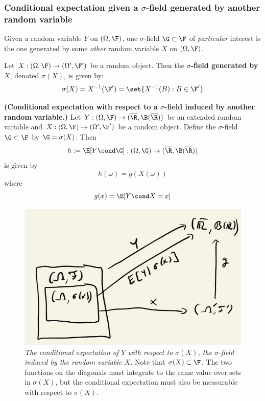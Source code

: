 \documentclass{article} %
\begin{document}
\subsubsection{Conditional expectation given a $\sigma$-field generated by another random variable}  \label{sec:conditional_expectation_wrt_a_sigma_field_induced_by_another_random_variable}

Given a random variable $Y$ on $(\Omega, \F)$, one $\sigma$-field $\G \subset \F$ of \textit{particular} interest is the one generated by some \textit{other} random variable $X$ on $(\Omega, \F)$.

\begin{definition}
Let $X: (\Omega, \F) \to (\Omega', \F')$ be a random object.  Then the \textbf{$\sigma$-field generated by $X$}, denoted $\sigma(X)$, is given by:
\[ \sigma(X) = X^{-1}(\F') = \set{X^{-1}(B) : B \in \F'} \]
\label{def:sigma_field_generated_by_a_random_object}
\end{definition}

\begin{proposition}\textbf{(Conditional expectation with respect to a $\sigma$-field induced by another random variable.)}
Let $Y: (\Omega, \F) \to (\overline{\R}, \B(\overline{\R}))$ be an extended random variable and  $X: (\Omega, \F) \to (\Omega', \F')$ be a random object.  Define the $\sigma$-field $\G \subset \F$ by $\G =\sigma(X)$.  
Then 
\[ h:= \E[Y \cond \G] : (\Omega, \G) \to (\overline{\R}, \B(\overline{\R}))\]
is given by 
\[ h(\omega) = g(X(\omega))\]
where 
\[g(x) = \E[Y \cond X=x]\]
\label{prop:conditional_expectation_wrt_sigma_field_induced_by_another_random_variable}
\end{proposition}

\begin{figure}[H]
\centering
\includegraphics[width=.6\linewidth]{images/conditional_expectation_wrt_sigma_field_induced_by_RV}
\caption{\textit{The conditional expectation of $Y$ with respect to $\sigma(X)$, the $\sigma$-field induced by the random variable $X$.} Note that $\sigma(X) \subset \F$. The two functions on the diagonals must integrate to the same value over sets in $\sigma(X)$, but the conditional expectation must also be measurable with respect to $\sigma(X)$.}
\label{fig:conditional_expectation_with_respect_to_a_sigma_field_induced_by_another_random_variable}	
\end{figure}
\end{document}
